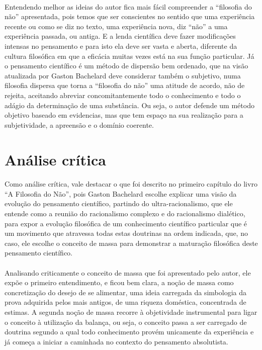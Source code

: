 \documentclass[11pt]{article}
\begin{document}
\paragraph{}
    Entendendo melhor as ideias do autor fica mais fácil compreender a “filosofia do não” apresentada, pois temos que ser conscientes no sentido que uma experiência recente ou como se diz no texto, uma experiência nova, diz “não” a uma experiência passada, ou antiga. E a lenda científica deve fazer modificações intensas no pensamento e para isto ela deve ser vasta e aberta, diferente da cultura filosófica em que a eficácia muitas vezes está na sua função particular. Já o pensamento científico é um método de dispersão bem ordenado, que na visão atualizada por Gaston Bachelard deve considerar também o subjetivo, numa filosofia dispersa que torna a “filosofia do não” uma atitude de acordo, não de rejeita, aceitando abreviar concomitantemente todo o conhecimento e todo o adágio da determinação de uma substância. Ou seja, o autor defende um método objetivo baseado em evidencias, mas que tem espaço na sua realização para a subjetividade, a apreensão e o domínio coerente.


\section{Análise crítica}

\paragraph{}
    Como análise crítica, vale destacar o que foi descrito no primeiro capítulo do livro “A Filosofia do Não”, pois Gaston Bachelard escolhe explicar uma visão da evolução do pensamento científico, partindo do ultra-racionalismo, que ele entende como a reunião do racionalismo complexo e do racionalismo dialético, para expor a evolução filosófica de um conhecimento científico particular que é um movimento que atravessa todas estas doutrinas na ordem indicada, que, no caso, ele escolhe o conceito de massa para demonstrar a maturação filosófica deste pensamento científico. 

\paragraph{}
    Analisando criticamente o conceito de massa que foi apresentado pelo autor, ele expõe o primeiro entendimento, e ficou bem clara, a noção de massa como concretização do desejo de se alimentar, uma ideia carregada da simbologia da prova adquirida pelos mais antigos, de uma riqueza doméstica, concentrada de estimas. A segunda noção de massa recorre à objetividade instrumental para ligar o conceito à utilização da balança, ou seja, o conceito passa a ser carregado de doutrina segundo a qual todo conhecimento provém unicamente da experiência e já começa a iniciar a caminhada no contexto do pensamento absolutista.
    
\end{document}
